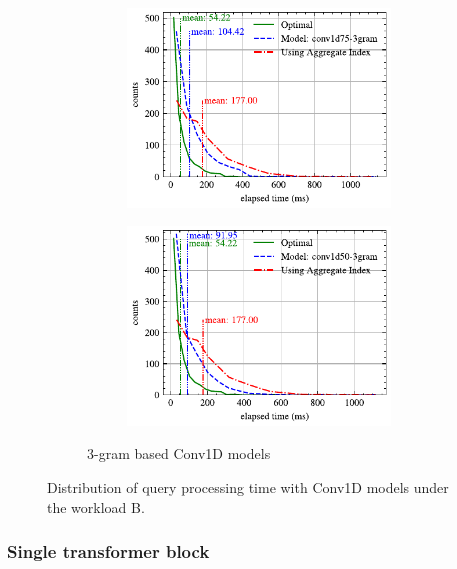 \begin{figure}[!h]
\begin{subfigure}{0.45\textwidth}
\begin{subfigure}{\textwidth}
			\includegraphics[]{my/graphics/perf_dist_conv1d75_3gram_B.pdf}
		\end{subfigure}
		\vfill
		\begin{subfigure}{\textwidth}
			\centering
			\includegraphics[]{my/graphics/perf_dist_conv1d50_3gram_B.pdf}
		\end{subfigure}
		\caption{3-gram based Conv1D models}
	\end{subfigure}
	\caption{Distribution of query processing time with Conv1D models under the workload B.}
	\label{fig:conv1d_perf_all_B}
\end{figure}

\subsubsection{Single transformer block}

